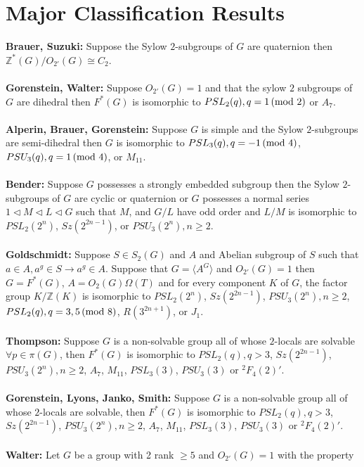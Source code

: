 \section{Major Classification Results}
{\bf Brauer, Suzuki:} Suppose the Sylow $2$-subgroups of $G$ are quaternion then
${\mathbb Z}^*(G)/O_{2'}(G) \cong C_2$.
\\
\\
{\bf Gorenstein, Walter:} Suppose $O_{2'}(G)=1$ and that the sylow $2$ subgroups of $G$ are
dihedral then $F^*(G)$ is isomorphic to $PSL_2(q), q=1 \thinspace \textnormal{(mod } 2 \textnormal{)}$ or $A_7$.
\\
\\
{\bf Alperin, Brauer, Gorenstein:} Suppose $G$ is simple and the Sylow
$2$-subgroups are semi-dihedral then $G$ is isomorphic to
$PSL_3(q), q= -1 \thinspace \textnormal{(mod } 4 \textnormal{)}$,
$PSU_3(q), q= 1 \thinspace \textnormal{(mod } 4 \textnormal{)}$,
or $M_{11}$.
\\
\\
{\bf Bender:} Suppose $G$ possesses a strongly embedded subgroup then the Sylow
$2$-subgroups of $G$ are cyclic or quaternion or $G$ possesses a normal series
$1 \lhd M \lhd L \lhd G$ such that $M$, and $G/L$ have odd order and
$L/M$ is isomorphic to
$PSL_2(2^n)$, $Sz(2^{2n-1})$, or $PSU_3(2^n), n \ge 2$.
\\
\\
{\bf Goldschmidt:} Suppose $S \in S_2(G)$ and $A$ and Abelian subgroup of $S$
such that $a \in A, a^g \in S \rightarrow a^g \in A$.  Suppose that $G= \langle A^G \rangle $ and
$O_{2'}(G)=1$ then $G=F^*(G)$, $A=O_2(G) \Omega(T)$ and for every component
$K$ of $G$, the factor group $K/{\mathbb Z}(K)$ is isomorphic to
$PSL_2(2^n)$, $Sz(2^{2n-1})$, $PSU_3(2^n), n \ge 2$, $PSL_2(q), q = 3, 5 \thinspace \textnormal{(mod } 8 \textnormal{)}$,
$R(3^{2n+1})$, or $J_1$.
\\
\\
{\bf Thompson:} Suppose $G$ is a non-solvable group all of whose
$2$-locals are solvable $\forall p \in \pi(G)$, then $F^*(G)$ is isomorphic to
$PSL_2(q), q>3$, $Sz(2^{2n-1})$, $PSU_3(2^n), n \ge 2$, $A_7$, $M_{11}$, $PSL_3(3)$,
$PSU_3(3)$
or $^2F_4(2)'$.
\\
\\
{\bf Gorenstein, Lyons, Janko, Smith:} Suppose $G$ is a non-solvable group all of whose
$2$-locals are solvable, then $F^*(G)$ is isomorphic to
$PSL_2(q), q > 3$, $Sz(2^{2n-1})$, $PSU_3(2^n), n \ge 2$, $A_7$, $M_{11}$, $PSL_3(3)$,
$PSU_3(3)$ or $^2F_4(2)'$.
\\
\\
{\bf Walter:} Let $G$ be a group with 2 rank $\ge 5$ and $O_{2'}(G)=1$ with the property
